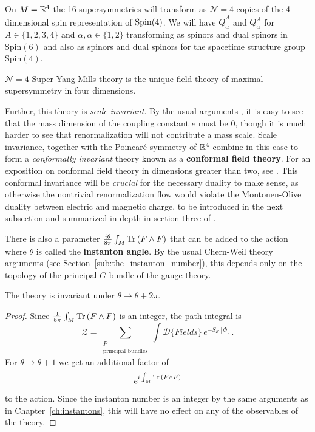 On $M=\mathbb{R}^4$ the 16 supersymmetries will transform as $\mathcal N=4$ copies of the 4-dimensional spin representation of $\mathrm{Spin}(4)$. We will have $\overline Q^A_{\alpha}$ and $Q^A_{\dot \alpha}$ for $A \in \{1,2,3,4\}$ and $\alpha, \dot \alpha \in \{1,2\}$ transforming as spinors and dual spinors in $\mathrm{Spin}(6)$ and also as spinors and dual spinors for the spacetime structure group $\mathrm{Spin}(4)$.


\begin{phys}
	$\mathcal N=4$ Super-Yang Mills theory is the unique field theory of maximal supersymmetry in four dimensions.
\end{phys}

Further, this theory is \emph{scale invariant}. By the usual arguments \cite{schwartz2014}, it is easy to see that the mass dimension of the coupling constant $e$ must be 0, though it is much harder to see that renormalization will not contribute a mass scale. Scale invariance, together with the Poincar\'e symmetry of $\mathbb{R}^4$ combine in this case to form a \emph{conformally invariant} theory known as a \textbf{conformal field theory}. For an exposition on conformal field theory in dimensions greater than two, see \cite{simmons2016}. This conformal invariance will be \emph{crucial} for the necessary duality to make sense, as otherwise the nontrivial renormalization flow would violate the Montonen-Olive duality between electric and magnetic charge, to be introduced in the next subsection and summarized in depth in section three of \cite{kapustin2008}.


There is also a parameter $\frac{i \theta}{8\pi} \int_M \mathrm{Tr}\, (F \wedge F)$ that can be added to the action where $\theta$ is called the \textbf{instanton angle}. By the usual Chern-Weil theory arguments (see Section~\ref{sub:the_instanton_number}), this depends only on the topology of the principal $G$-bundle of the gauge theory.
\begin{obs}
	The theory is invariant under $\theta \to \theta + 2\pi$.
\end{obs}
\begin{proof}
	Since $\frac{1}{8\pi} \int_M \mathrm{Tr}\, (F \wedge F)$ is an integer, the path integral is
	\[
		\mathcal Z = \sum_{\substack{P \\ \text{principal bundles}}} \int \mathcal D\{ Fields \} \, e^{- S_E[\Phi]}.
	\]
	For $\theta \to \theta+1$ we get an additional factor of 
	\[
		e^{i \int_M \mathrm{Tr}\,(F \wedge F)}
	\] 
	to the action. Since the instanton number is an integer by the same arguments as in Chapter~\ref{ch:instantons}, this will have no effect on any of the observables of the theory.
\end{proof}


